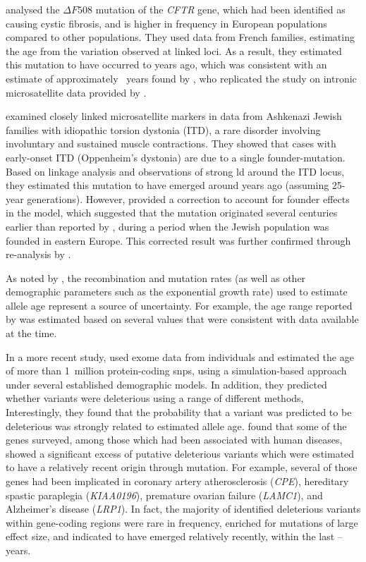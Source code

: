  analysed the ${\Delta{F508}}$ mutation of the \textsl{CFTR} gene, which had been identified as causing cystic fibrosis, and is higher in frequency in European populations compared to other populations.
They used  data from  French families, estimating the age from the variation observed at  linked loci.
As a result, they estimated this mutation to have occurred  to  years ago, which was consistent with an estimate of approximately ~years found by \citet{Slatkin:2000us}, who replicated the study on intronic microsatellite data provided by \citet{Morral:1994vx}.

 examined  closely linked microsatellite markers in data from  Ashkenazi Jewish families with idiopathic torsion dystonia (ITD), a rare disorder involving involuntary and sustained muscle contractions.
They showed that cases with early-onset ITD (Oppenheim's dystonia) are due to a single founder-mutation.
Based on linkage analysis and observations of strong \gls{ld} around the ITD locus, they estimated this mutation to have emerged around  years ago (assuming 25-year generations).
However, \citet{labuda1996linkage} provided a correction to account for founder effects in the model, which suggested that the mutation originated several centuries earlier than reported by \citet{Risch:1995ir}, during a period when the Jewish population was founded in eastern Europe.
This corrected result was further confirmed through re-analysis by \citet{Slatkin:2000us}.

As noted by \citet{Slatkin:2000us}, the recombination and mutation rates (as well as other demographic parameters such as the exponential growth rate) used to estimate allele age represent a source of uncertainty.
For example, the age range reported by \citet{Serre:1990uy} was estimated based on several values that were consistent with data available at the time.

In a more recent study, \citet{Fu:2012hg} used exome data from  individuals and estimated the age of more than 1~million protein-coding \glspl{snp}, using a simulation-based approach under several established demographic models.
In addition, they predicted whether variants were deleterious using a range of different methods, Interestingly, they found that the probability that a variant was predicted to be deleterious was strongly related to estimated allele age.
 found that some of the genes surveyed, among those which had been associated with human diseases, showed a significant excess of putative deleterious variants which were estimated to have a relatively recent origin through mutation.
For example, several of those genes had been implicated in coronary artery atherosclerosis (\textsl{CPE}), hereditary spastic paraplegia (\textsl{KIAA0196}), premature ovarian failure (\textsl{LAMC1}), and Alzheimer's disease (\textsl{LRP1}).
In fact, the majority of identified deleterious variants within gene-coding regions were rare in frequency, enriched for mutations of large effect size, and indicated to have emerged relatively recently, within the last -- years.


